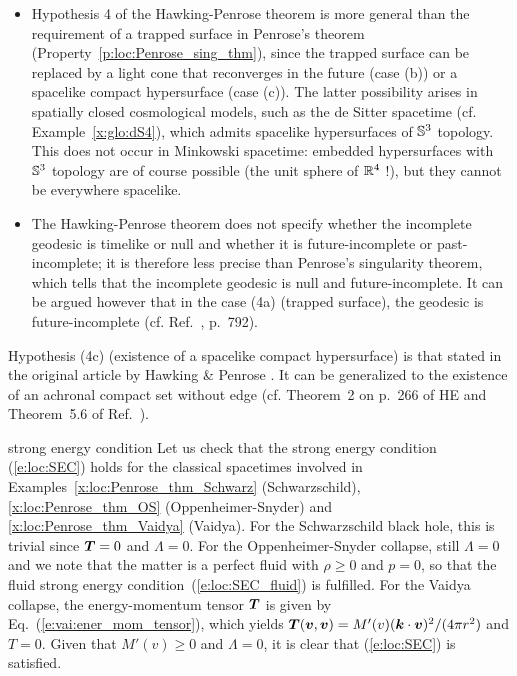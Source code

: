 \begin{itemize}
involving a high degree of symmetry, hence the qualifier \emph{generic}. An example is the Einstein static universe considered in Sec.~\ref{s:glo:conf_complet_Mink} [Eq.~(\ref{e:glo:tg_Einstein})]:
it can be shown \cite{Senov98} that the curves $(\chi,\th,\ph) = \mathrm{const}$ are timelike geodesics that have $R^\alpha_{\ \; \mu\nu\beta} v^\mu v^\nu  = 0$ all along them.
\item Hypothesis 4 of the Hawking-Penrose theorem is more general than the requirement of
a trapped surface in Penrose's theorem (Property~\ref{p:loc:Penrose_sing_thm}), since the
trapped surface can be replaced by a light cone that reconverges in the future
(case (b)) or a spacelike compact hypersurface (case (c)). The latter possibility arises
in spatially closed cosmological models, such as the de Sitter spacetime
(cf. Example~\ref{x:glo:dS4}), which admits spacelike hypersurfaces of $\mathbb{S}^3$ topology. This does not occur in Minkowski spacetime: embedded hypersurfaces with $\mathbb{S}^3$ topology
are of course possible (the unit sphere of $\mathbb{R}^4$ !), but they cannot be everywhere spacelike.
\item The Hawking-Penrose theorem does not specify whether the incomplete geodesic is timelike or
null and whether it is future-incomplete or past-incomplete; it is therefore less precise
than Penrose's singularity theorem, which tells that the incomplete geodesic is null and future-incomplete.
It can be argued however that in the case (4a) (trapped surface), the geodesic is
future-incomplete (cf.  Ref.~\cite{Senov98}, p.~792).
\end{itemize}

\begin{remark}
Hypothesis (4c) (existence of a spacelike compact hypersurface) is
that stated in the original article by Hawking \& Penrose \cite{HawkiP70}.
It can be generalized to the existence of an achronal compact set without
edge (cf. Theorem~2 on p.~266 of HE \cite{HawkiE73} and Theorem~5.6 of Ref.~\cite{Senov98}).
\end{remark}

\begin{texample}{strong energy condition}{}
Let us check that the strong energy condition (\ref{e:loc:SEC}) holds for the classical
spacetimes involved in Examples~\ref{x:loc:Penrose_thm_Schwarz} (Schwarzschild),
\ref{x:loc:Penrose_thm_OS} (Oppenheimer-Snyder) and \ref{x:loc:Penrose_thm_Vaidya} (Vaidya).
For the Schwarzschild black hole, this is trivial since $\bm{T} = 0$ and $\Lambda=0$.
For the Oppenheimer-Snyder collapse, still $\Lambda=0$ and we note that the matter is a
perfect fluid with $\rho \geq 0$ and $p=0$,
so that the fluid strong energy condition~(\ref{e:loc:SEC_fluid}) is fulfilled.
For the Vaidya collapse, the energy-momentum tensor $\bm{T}$ is given by Eq.~(\ref{e:vai:ener_mom_tensor}),
which yields $\bm{T}(\bm{v},\bm{v}) = M'(v) (\bm{k}\cdot\bm{v})^2 / (4\pi r^2)$ and $T = 0$. Given that
$M'(v) \geq 0$ and $\Lambda=0$, it is clear that (\ref{e:loc:SEC}) is satisfied.
\end{texample}

